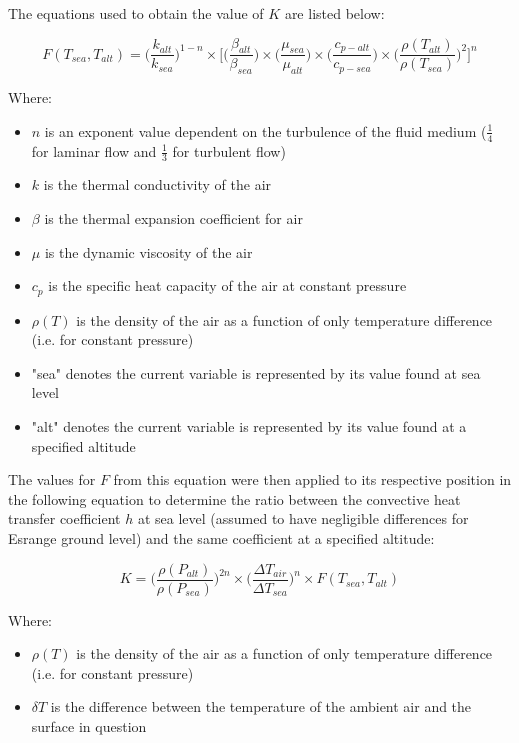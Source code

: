\documentclass[a4paper,12pt,oneside]{article}
\begin{document}
\begin{appendices}
The equations used to obtain the value of $K$ are listed below:

\begin{equation*}
F(T_{sea}, T_{alt}) = \big(\frac{k_{alt}}{k_{sea}}\big)^{1-n}\times \Big[\Big(\frac{\beta_{alt}}{\beta_{sea}}\Big)\times \Big(\frac{\mu_{sea}}{\mu_{alt}}\Big)\times \Big(\frac{c_{p-alt}}{c_{p-sea}}\Big)\times \Big(\frac{\rho(T_{alt})}{\rho(T_{sea})}\Big)^{2}\Big]^{n}
\end{equation*}

Where:
\begin{itemize}
    \item $n$ is an exponent value dependent on the turbulence of the fluid medium ($\frac{1}{4}$ for laminar flow and $\frac{1}{3}$ for turbulent flow)
    \item $k$ is the thermal conductivity of the air
    \item $\beta$ is the thermal expansion coefficient for air
    \item $\mu$ is the dynamic viscosity of the air
    \item $c_{p}$ is the specific heat capacity of the air at constant pressure
    \item $\rho(T)$ is the density of the air as a function of only temperature difference (i.e. for constant pressure)
    \item "sea" denotes the current variable is represented by its value found at sea level
    \item "alt" denotes the current variable is represented by its value found at a specified altitude
\end{itemize}


The values for $F$ from this equation were then applied to its respective position in the following equation to determine the ratio between the convective heat transfer coefficient $h$ at sea level (assumed to have negligible differences for Esrange ground level) and the same coefficient at a specified altitude:

\begin{equation*}
K = \Big(\frac{\rho(P_{alt})}{\rho(P_{sea})}\Big)^{2n}\times \Big(\frac{\Delta T_{air}}{\Delta T_{sea}}\Big)^{n}\times F(T_{sea}, T_{alt})
\end{equation*}

Where:
\begin{itemize}
    \item $\rho(T)$ is the density of the air as a function of only temperature difference (i.e. for constant pressure)
    \item $\delta T$ is the difference between the temperature of the ambient air and the surface in question
\end{itemize} \\



\end{appendices}
\end{document}
